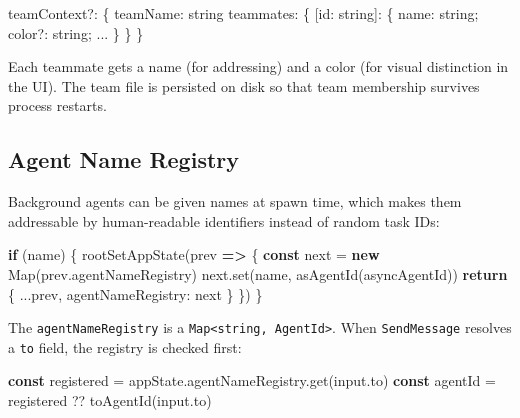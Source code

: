\documentclass[
  english,
  11pt,
  letterpaper,
]{book}
\newenvironment{Shaded}{\begin{snugshade}}{\end{snugshade}}
\newcommand{\AttributeTok}[1]{\textcolor[rgb]{0.40,0.45,0.13}{#1}}
\newcommand{\BuiltInTok}[1]{\textcolor[rgb]{0.00,0.23,0.31}{#1}}
\newcommand{\ControlFlowTok}[1]{\textcolor[rgb]{0.00,0.23,0.31}{\textbf{#1}}}
\newcommand{\DataTypeTok}[1]{\textcolor[rgb]{0.68,0.00,0.00}{#1}}
\newcommand{\FunctionTok}[1]{\textcolor[rgb]{0.28,0.35,0.67}{#1}}
\newcommand{\KeywordTok}[1]{\textcolor[rgb]{0.00,0.23,0.31}{\textbf{#1}}}
\newcommand{\NormalTok}[1]{\textcolor[rgb]{0.00,0.23,0.31}{#1}}
\newcommand{\OperatorTok}[1]{\textcolor[rgb]{0.37,0.37,0.37}{#1}}
\begin{document}
\begin{Shaded}
\begin{Highlighting}[]
\NormalTok{teamContext}\OperatorTok{?:}\NormalTok{ \{}
\NormalTok{  teamName}\OperatorTok{:} \DataTypeTok{string}
\NormalTok{  teammates}\OperatorTok{:}\NormalTok{ \{}
\NormalTok{    [id}\OperatorTok{:} \DataTypeTok{string}\NormalTok{]}\OperatorTok{:}\NormalTok{ \{ name}\OperatorTok{:} \DataTypeTok{string}\OperatorTok{;}\NormalTok{ color}\OperatorTok{?:} \DataTypeTok{string}\OperatorTok{;} \OperatorTok{...}\NormalTok{ \}}
\NormalTok{  \}}
\NormalTok{\}}
\end{Highlighting}
\end{Shaded}

Each teammate gets a name (for addressing) and a color (for visual
distinction in the UI). The team file is persisted on disk so that team
membership survives process restarts.

\subsection{Agent Name Registry}\label{agent-name-registry}

Background agents can be given names at spawn time, which makes them
addressable by human-readable identifiers instead of random task IDs:

\begin{Shaded}
\begin{Highlighting}[]
\ControlFlowTok{if}\NormalTok{ (name) \{}
  \FunctionTok{rootSetAppState}\NormalTok{(prev }\KeywordTok{=\textgreater{}}\NormalTok{ \{}
    \KeywordTok{const}\NormalTok{ next }\OperatorTok{=} \KeywordTok{new} \BuiltInTok{Map}\NormalTok{(prev}\OperatorTok{.}\AttributeTok{agentNameRegistry}\NormalTok{)}
\NormalTok{    next}\OperatorTok{.}\FunctionTok{set}\NormalTok{(name}\OperatorTok{,} \FunctionTok{asAgentId}\NormalTok{(asyncAgentId))}
    \ControlFlowTok{return}\NormalTok{ \{ }\OperatorTok{...}\NormalTok{prev}\OperatorTok{,}\NormalTok{ agentNameRegistry}\OperatorTok{:}\NormalTok{ next \}}
\NormalTok{  \})}
\NormalTok{\}}
\end{Highlighting}
\end{Shaded}

The \texttt{agentNameRegistry} is a
\texttt{Map\textless{}string,\ AgentId\textgreater{}}. When
\texttt{SendMessage} resolves a \texttt{to} field, the registry is
checked first:

\begin{Shaded}
\begin{Highlighting}[]
\KeywordTok{const}\NormalTok{ registered }\OperatorTok{=}\NormalTok{ appState}\OperatorTok{.}\AttributeTok{agentNameRegistry}\OperatorTok{.}\FunctionTok{get}\NormalTok{(input}\OperatorTok{.}\AttributeTok{to}\NormalTok{)}
\KeywordTok{const}\NormalTok{ agentId }\OperatorTok{=}\NormalTok{ registered }\OperatorTok{??} \FunctionTok{toAgentId}\NormalTok{(input}\OperatorTok{.}\AttributeTok{to}\NormalTok{)}
\end{Highlighting}
\end{Shaded}
\end{document}
